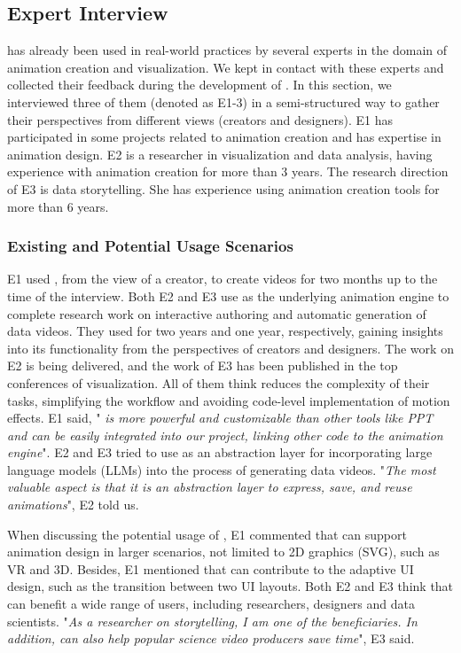 \subsection{Expert Interview}
\label{ssec:expert_interview}

\gaia{} has already been used in real-world practices by several experts in the domain of animation creation and visualization. 
We kept in contact with these experts and collected their feedback during the development of \gaia{}.
In this section, we interviewed three of them (denoted as E1-3) in a semi-structured way to gather their perspectives from different views (creators and designers).
E1 has participated in some projects related to animation creation and has expertise in animation design. 
E2 is a researcher in visualization and data analysis, having experience with animation creation for more than 3 years.
The research direction of E3 is data storytelling. She has experience using animation creation tools for more than 6 years.

\subsubsection{Existing and Potential Usage Scenarios}

E1 used \gaia{}, from the view of a creator, to create videos for two months up to the time of the interview.
Both E2 and E3 use \gaia{} as the underlying animation engine to complete research work on interactive authoring and automatic generation of data videos.
They used \gaia{} for two years and one year, respectively, gaining insights into its functionality from the perspectives of creators and designers.
The work on E2 is being delivered, and the work of E3 has been published in the top conferences of visualization.
All of them think \gaia{} reduces the complexity of their tasks, simplifying the workflow and avoiding code-level implementation of motion effects.
E1 said, "\textit{\gaia{} is more powerful and customizable than other tools like PPT and can be easily integrated into our project, linking other code to the animation engine}".
E2 and E3 tried to use \gaia{} as an abstraction layer for incorporating large language models (LLMs) into the process of generating data videos.
"\textit{The most valuable aspect is that it is an abstraction layer to express, save, and reuse animations}", E2 told us.

When discussing the potential usage of \gaia{}, E1 commented that \gaia{} can support animation design in larger scenarios, not limited to 2D graphics (\eg SVG), such as VR and 3D.
Besides, E1 mentioned that \gaia{} can contribute to the adaptive UI design, such as the transition between two UI layouts.
Both E2 and E3 think that \gaia{} can benefit a wide range of users, including researchers, designers and data scientists.
"\textit{As a researcher on storytelling, I am one of the beneficiaries. In addition, \gaia{} can also help popular science video producers save time}", E3 said.


